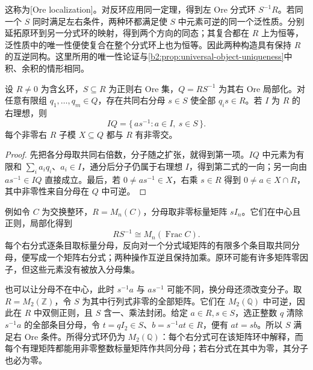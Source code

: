 这称为[Ore localization]。对反环应用同一定理，得到左 Ore 分式环 \(S^{-1}R\)。若同一个 \(S\) 同时满足左右条件，两种环都满足使 \(S\) 中元素可逆的同一个泛性质。分别延拓原环到另一分式环的映射，得到两个方向的同态；其复合都在 \(R\) 上为恒等，泛性质中的唯一性便使复合在整个分式环上也为恒等。因此两种构造具有保持 \(R\) 的互逆同构。这里所用的唯一性论证与\cref{b2:prop:universal-object-uniqueness}中积、余积的情形相同。

\begin{proposition}\label{b2:prop:ore-clearing-denominators}
	设 \(R\ne0\) 为含幺环，\(S\subseteq R\) 为正则右 Ore 集，\(Q=RS^{-1}\) 为其右 Ore 局部化。对任意有限组 \(q_1,\ldots,q_m\in Q\)，存在共同右分母 \(s\in S\) 使全部 \(q_i s\in R\)。若 \(I\) 为 \(R\) 的右理想，则
	\[
		IQ=\{\,as^{-1}:a\in I,\ s\in S\,\}.
	\]
	每个非零右 \(R\) 子模 \(X\subseteq Q\) 都与 \(R\) 有非零交。
\end{proposition}
\begin{proof}
	先把各分母取共同右倍数，分子随之扩张，就得到第一项。\(IQ\) 中元素为有限和 \(\sum_i a_iq_i\)、\(a_i\in I\)，通分后分子仍属于右理想 \(I\)，得到第二式的一向；另一向由 \(as^{-1}\in IQ\) 直接成立。最后，若 \(0\ne as^{-1}\in X\)，右乘 \(s\in R\) 得到 \(0\ne a\in X\cap R\)，其中非零性来自分母在 \(Q\) 中可逆。
\end{proof}

例如令 \(C\) 为交换整环，\(R=M_n(C)\)，分母取非零标量矩阵 \(sI_n\)。它们在中心且正则，局部化得到
\[
	RS^{-1}\cong M_n(\operatorname{Frac}C).
\]
每个右分式逐条目取标量分母，反向对一个分式域矩阵的有限多个条目取共同分母，便写成一个矩阵右分式；两种操作互逆且保持加乘。原环可能有许多矩阵零因子，但这些元素没有被放入分母集。

\ProseParagraphBreak
也可以让分母不在中心，此时 \(s^{-1}a\) 与 \(as^{-1}\) 可能不同，换分母还须改变分子。取 \(R=M_2(\mathbb Z)\)，令 \(S\) 为其中行列式非零的全部矩阵。它们在 \(M_2(\mathbb Q)\) 中可逆，因此在 \(R\) 中双侧正则，且 \(S\) 含一、乘法封闭。给定 \(a\in R,s\in S\)，选正整数 \(q\) 清除 \(s^{-1}a\) 的全部条目分母，令 \(t=qI_2\in S\)、\(b=s^{-1}at\in R\)，便有 \(at=sb\)。所以 \(S\) 满足右 Ore 条件。所得分式环仍为 \(M_2(\mathbb Q)\)：每个右分式可在该矩阵环中解释，而每个有理矩阵都能用非零整数标量矩阵作共同分母；若右分式在其中为零，其分子也必为零。

